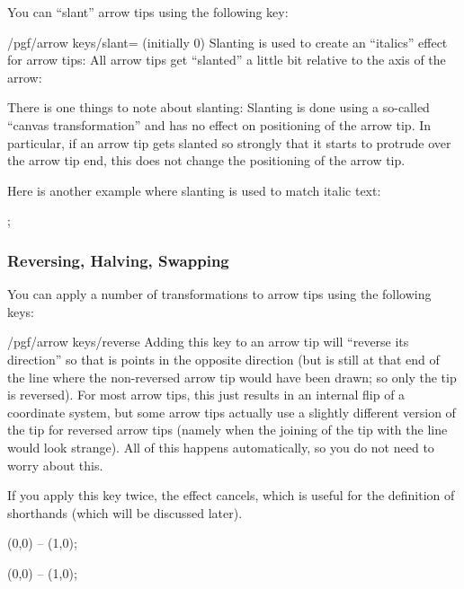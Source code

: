 You can ``slant'' arrow tips using the following key:

\begin{key}{/pgf/arrow keys/slant= (initially 0)}
  Slanting is used to create an ``italics'' effect for arrow tips: All
  arrow tips get ``slanted'' a little bit relative to the axis of the
  arrow:
\begin{codeexample}[]
\end{codeexample}  
  There is one things to note about slanting: Slanting is done using a
  so-called ``canvas transformation''  and has no effect on
  positioning of the arrow tip. In particular, if an arrow tip gets
  slanted so strongly that it starts to protrude over the arrow tip
  end, this does not change the positioning of the arrow tip.

  Here is another example where slanting is used to match italic text:
\begin{codeexample}[]
\tikz [>={[slant=.3] To[] To[]}]
  ;  
\end{codeexample}
\end{key}



\subsubsection{Reversing, Halving, Swapping}
\label{section-arrow-key-harpoon}

You can apply a number of transformations to arrow tips using the
following keys:

\begin{key}{/pgf/arrow keys/reverse}
  Adding this key to an arrow tip will ``reverse its direction'' so
  that is points in the opposite direction (but is still at that end of the
  line where the non-reversed arrow tip would have been drawn; so only
  the tip is reversed). For most arrow tips, this just results in an
  internal flip of a coordinate system, but some arrow tips actually
  use a slightly different version of the tip for reversed arrow tips
  (namely when the joining of the tip with the line would look
  strange). All of this happens automatically, so you do not need to
  worry about this.

  If you apply this key twice, the effect cancels, which is useful for
  the definition of shorthands (which will be discussed later).
\begin{codeexample}[width=3cm]
 \draw [arrows = {-Stealth[reversed]}] (0,0) -- (1,0);
\end{codeexample}
\begin{codeexample}[width=3cm]
 \draw [arrows = {-Stealth[reversed, reversed]}] (0,0) -- (1,0);
\end{codeexample}
\end{key}

